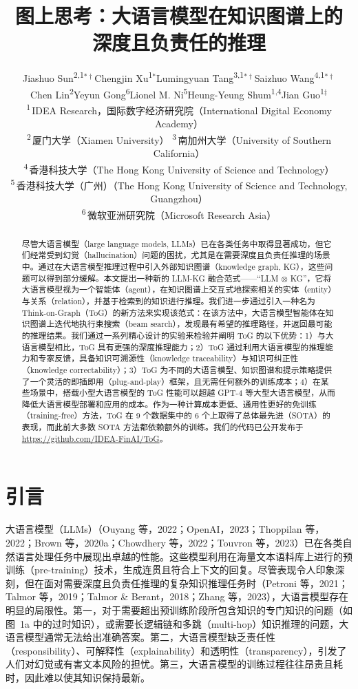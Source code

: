 \documentclass[11pt,UTF8,fontset=fandol]{ctexart}
\title{\textbf{图上思考：大语言模型在知识图谱上的\\深度且负责任的推理}}
\author{Jiashuo Sun\textsuperscript{2,1}$^{*\dagger}$\quad Chengjin Xu\textsuperscript{1}$^{*}$\quad Lumingyuan Tang\textsuperscript{3,1}$^{*\dagger}$\quad Saizhuo Wang\textsuperscript{4,1}$^{*\dagger}$\\
Chen Lin\textsuperscript{2}\quad Yeyun Gong\textsuperscript{6}\quad Lionel M. Ni\textsuperscript{5}\quad Heung-Yeung Shum\textsuperscript{1,4}\quad Jian Guo\textsuperscript{1}$^{\ddagger}$\\[0.4em]
\textsuperscript{1}\,IDEA Research，国际数字经济研究院（International Digital Economy Academy）\\
\textsuperscript{2}\,厦门大学（Xiamen University）\quad
\textsuperscript{3}\,南加州大学（University of Southern California）\\
\textsuperscript{4}\,香港科技大学（The Hong Kong University of Science and Technology）\\
\textsuperscript{5}\,香港科技大学（广州）（The Hong Kong University of Science and Technology, Guangzhou）\\
\textsuperscript{6}\,微软亚洲研究院（Microsoft Research Asia）}
\date{}
\newcommand{\oxkg}{\ensuremath{\otimes}}
\begin{document}
\maketitle

\renewcommand{\thefootnote}{\fnsymbol{footnote}}
\renewcommand{\thefootnote}{\arabic{footnote}}
\setcounter{footnote}{0}

\begin{abstract}
尽管大语言模型（large language models, LLMs）已在各类任务中取得显著成功，但它们经常受到幻觉（hallucination）问题的困扰，尤其是在需要深度且负责任推理的场景中。通过在大语言模型推理过程中引入外部知识图谱（knowledge graph, KG），这些问题可以得到部分缓解。本文提出一种新的 LLM-KG 融合范式——“LLM \oxkg{} KG”，它将大语言模型视为一个智能体（agent），在知识图谱上交互式地探索相关的实体（entity）与关系（relation），并基于检索到的知识进行推理。我们进一步通过引入一种名为 Think-on-Graph（ToG）的新方法来实现该范式：在该方法中，大语言模型智能体在知识图谱上迭代地执行束搜索（beam search），发现最有希望的推理路径，并返回最可能的推理结果。我们通过一系列精心设计的实验来检验并阐明 ToG 的以下优势：1）与大语言模型相比，ToG 具有更强的深度推理能力；2）ToG 通过利用大语言模型的推理能力和专家反馈，具备知识可溯源性（knowledge traceability）与知识可纠正性（knowledge correctability）；3）ToG 为不同的大语言模型、知识图谱和提示策略提供了一个灵活的即插即用（plug-and-play）框架，且无需任何额外的训练成本；4）在某些场景中，搭载小型大语言模型的 ToG 性能可以超越 GPT-4 等大型大语言模型，从而降低大语言模型部署和应用的成本。作为一种计算成本更低、通用性更好的免训练（training-free）方法，ToG 在 9 个数据集中的 6 个上取得了总体最先进（SOTA）的表现，而此前大多数 SOTA 方法都依赖额外的训练。我们的代码已公开发布于 \url{https://github.com/IDEA-FinAI/ToG}。
\end{abstract}

\section{引言}

大语言模型（LLMs）（Ouyang 等，2022；OpenAI，2023；Thoppilan 等，2022；Brown 等，2020a；Chowdhery 等，2022；Touvron 等，2023）已在各类自然语言处理任务中展现出卓越的性能。这些模型利用在海量文本语料库上进行的预训练（pre-training）技术，生成连贯且符合上下文的回复。尽管表现令人印象深刻，但在面对需要深度且负责任推理的复杂知识推理任务时（Petroni 等，2021；Talmor 等，2019；Talmor \& Berant，2018；Zhang 等，2023），大语言模型存在明显的局限性。第一，对于需要超出预训练阶段所包含知识的专门知识的问题（如图~1a 中的过时知识），或需要长逻辑链和多跳（multi-hop）知识推理的问题，大语言模型通常无法给出准确答案。第二，大语言模型缺乏责任性（responsibility）、可解释性（explainability）和透明性（transparency），引发了人们对幻觉或有害文本风险的担忧。第三，大语言模型的训练过程往往昂贵且耗时，因此难以使其知识保持最新。
\end{document}
